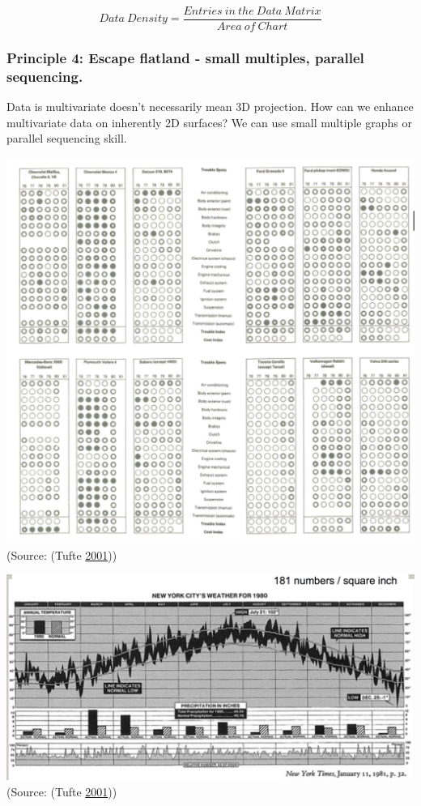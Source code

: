 \documentclass[]{book}
\theoremstyle{definition}
\theoremstyle{definition}
\theoremstyle{definition}
\theoremstyle{remark}
\begin{document}
\[{Data \ Density} = \frac{{Entries \ in \ the \ Data \ Matrix}}{{Area \ of \ Chart}}\]

\subsubsection{Principle 4: Escape flatland - small multiples, parallel
sequencing.}\label{principle-4-escape-flatland---small-multiples-parallel-sequencing.}

Data is multivariate doesn't necessarily mean 3D projection. How can we
enhance multivariate data on inherently 2D surfaces? We can use small
multiple graphs or parallel sequencing skill.

\includegraphics{images/Tufte_figure8.png} (Source: (Tufte
\protect\hyperlink{ref-Tufte_2001}{2001}))

\includegraphics{images/Tufte_figure7.png} (Source: (Tufte
\protect\hyperlink{ref-Tufte_2001}{2001}))
\end{document}
